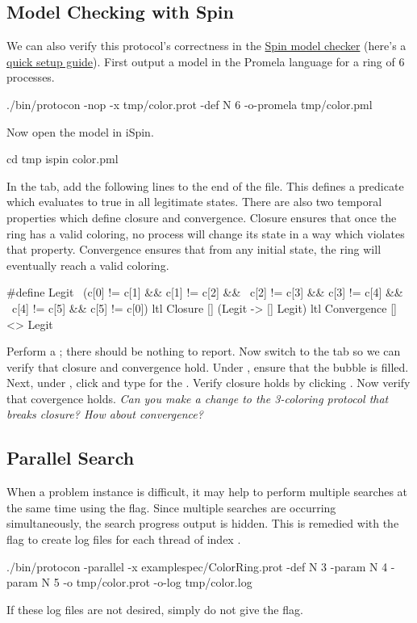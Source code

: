 \subsection{Model Checking with Spin}
We can also verify this protocol's correctness in the \href{http://spinroot.com}{Spin model checker} (here's a \href{../../tut/spin.html}{quick setup guide}).
First output a model in the Promela language for a ring of $6$ processes.
\begin{code}
./bin/protocon -nop -x tmp/color.prot -def N 6 -o-promela tmp/color.pml
\end{code}
Now open the model in iSpin.
\begin{code}
cd tmp
ispin color.pml
\end{code}
In the  tab, add the following lines to the end of the file.
This defines a predicate  which evaluates to true in all legitimate states.
There are also two temporal properties which define closure and convergence.
Closure ensures that once the ring has a valid coloring, no process will change its state in a way which violates that property.
Convergence ensures that from any initial state, the ring will eventually reach a valid coloring.
\begin{code}
#define Legit \
  (c[0] != c[1] && c[1] != c[2] && \
   c[2] != c[3] && c[3] != c[4] && \
   c[4] != c[5] && c[5] != c[0])
ltl Closure { [] (Legit -> [] Legit) }
ltl Convergence { [] <> Legit }
\end{code}
Perform a \ilkey{Syntax Check}; there should be nothing to report.
Now switch to the  tab so we can verify that closure and convergence hold.
Under , ensure that the  bubble is filled.
Next, under \ilkey{Never Claims}, click \ilkey{use claim} and type  for the .
Verify closure holds by clicking \ilkey{Run}.
Now verify that covergence holds.
\textit{Can you make a change to the 3-coloring protocol that breaks closure? How about convergence?}

\subsection{Parallel Search}
When a problem instance is difficult, it may help to perform multiple searches at the same time using the  flag.
Since multiple searches are occurring simultaneously, the search progress output is hidden.
This is remedied with the  flag to create log files  for each thread of index .
\begin{code}
./bin/protocon -parallel -x examplespec/ColorRing.prot -def N 3 -param N 4 -param N 5 -o tmp/color.prot -o-log tmp/color.log
\end{code}
If these log files are not desired, simply do not give the flag.

